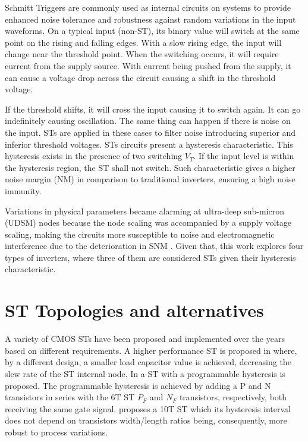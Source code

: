 \documentclass[diss,pgmicro,english]{iiufrgs}
\begin{document}
Schmitt Triggers are commonly used as internal circuits on systems to provide enhanced noise tolerance and robustness against random variations in the input waveforms. On a typical input (non-ST), its binary value will switch at the same point on the rising and falling edges. With a slow rising edge, the input will change near the threshold point. When the switching occurs, it will require current from the supply source. With current being pushed from the supply, it can cause a voltage drop across the circuit causing a shift in the threshold voltage.

If the threshold shifts, it will cross the input causing it to switch again. It can go indefinitely causing oscillation. The same thing can happen if there is noise on the input. STs are applied in these cases to filter noise introducing superior and inferior threshold voltages. STs circuits present a hysteresis characteristic. This hysteresis exists in the presence of two switching $V_T$. If the input level is within the hysteresis region, the ST shall not switch. Such characteristic gives a higher noise margin (NM) in comparison to traditional inverters, ensuring a high noise immunity.

 Variations in physical parameters became alarming at ultra-deep sub-micron (UDSM) nodes because the node scaling was accompanied by a supply voltage scaling, making the circuits more susceptible to noise and electromagnetic interference due to the deterioration in SNM \cite{pal2018circuit}. Given that, this work explores four types of inverters, where three of them are considered STs given their hysteresis characteristic.

 \section{ST Topologies and alternatives}

A variety of CMOS STs have been proposed and implemented over the years based on different requirements. A higher performance ST is proposed in \cite{steyaert1986novel} where, by a different design, a smaller load capacitor value is achieved, decreasing the slew rate of the ST internal node. In \cite{pfister1992novel} a ST with a programmable hysteresis is proposed. The programmable hysteresis is achieved by adding a P and N transistors in series with the 6T ST $P_F$ and $N_F$ transistors, respectively, both receiving the same gate signal. \cite{kim1993new} proposes a 10T ST which its hysteresis interval does not depend on transistors width/length ratios being, consequently, more robust to process variations.
\end{document}
